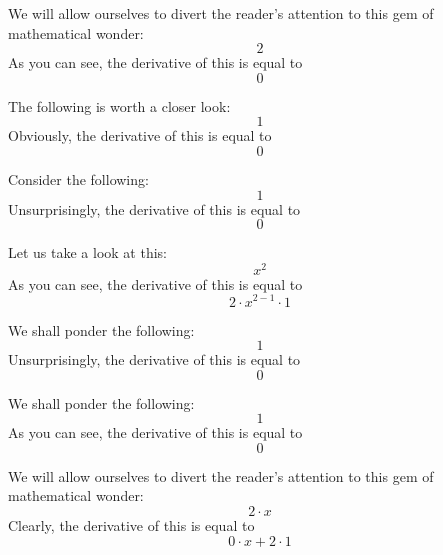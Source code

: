\documentclass{article}
\begin{document}
We will allow ourselves to divert the reader's attention to this gem of mathematical wonder:
\begin{equation}
2 
\end{equation}
As you can see, the derivative of this is equal to
\begin{equation}
0 
\end{equation}

The following is worth a closer look:
\begin{equation}
1 
\end{equation}
Obviously, the derivative of this is equal to
\begin{equation}
0 
\end{equation}

Consider the following:
\begin{equation}
1 
\end{equation}
Unsurprisingly, the derivative of this is equal to
\begin{equation}
0 
\end{equation}

Let us take a look at this:
\begin{equation}
x ^{2 } 
\end{equation}
As you can see, the derivative of this is equal to
\begin{equation}
2 \cdot x ^{2 - 1 } \cdot 1 
\end{equation}

We shall ponder the following:
\begin{equation}
1 
\end{equation}
Unsurprisingly, the derivative of this is equal to
\begin{equation}
0 
\end{equation}

We shall ponder the following:
\begin{equation}
1 
\end{equation}
As you can see, the derivative of this is equal to
\begin{equation}
0 
\end{equation}

We will allow ourselves to divert the reader's attention to this gem of mathematical wonder:
\begin{equation}
2 \cdot x 
\end{equation}
Clearly, the derivative of this is equal to
\begin{equation}
0 \cdot x + 2 \cdot 1 
\end{equation}
\end{document}
